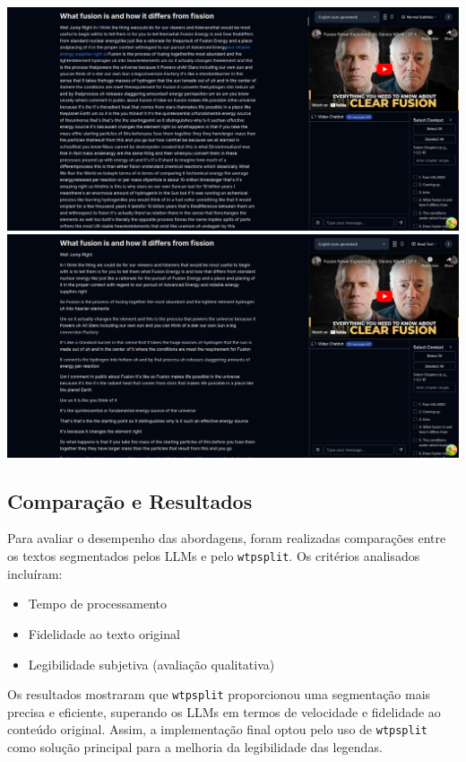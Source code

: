 \documentclass[tcc,capa]{texufpel}
\begin{document}
\includegraphics[width=\textwidth,height=\textheight,keepaspectratio]{exemplo-slides/graphics/images/pre-improved-readability.png}
\includegraphics[width=\textwidth,height=\textheight,keepaspectratio]{exemplo-slides/graphics/images/after-improved-readability.png}



\subsection{Comparação e Resultados}
Para avaliar o desempenho das abordagens, foram realizadas comparações entre os textos segmentados pelos LLMs e pelo \texttt{wtpsplit}. Os critérios analisados incluíram:
\begin{itemize}
    \item Tempo de processamento
    \item Fidelidade ao texto original
    \item Legibilidade subjetiva (avaliação qualitativa)
\end{itemize}

Os resultados mostraram que \texttt{wtpsplit} proporcionou uma segmentação mais precisa e eficiente, superando os LLMs em termos de velocidade e fidelidade ao conteúdo original. Assim, a implementação final optou pelo uso de \texttt{wtpsplit} como solução principal para a melhoria da legibilidade das legendas.
\end{document}
